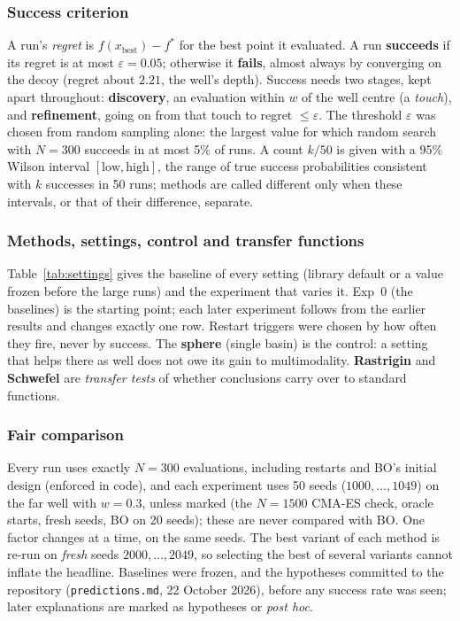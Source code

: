 \documentclass[10pt,a4paper]{article}
\begin{document}
\subsubsection{Success criterion}
A run's \emph{regret} is $f(x_{\text{best}})-f^\ast$ for the best point it evaluated. A run \textbf{succeeds} if its regret is at most $\varepsilon=0.05$; otherwise it \textbf{fails}, almost always by converging on the decoy (regret about $2.21$, the well's depth). Success needs two stages, kept apart throughout: \textbf{discovery}, an evaluation within $w$ of the well centre (a \emph{touch}), and \textbf{refinement}, going on from that touch to regret $\le\varepsilon$. The threshold $\varepsilon$ was chosen from random sampling alone: the largest value for which random search with $N=300$ succeeds in at most 5\% of runs. A count $k/50$ is given with a 95\% Wilson interval $[\text{low},\text{high}]$, the range of true success probabilities consistent with $k$ successes in 50 runs; methods are called different only when these intervals, or that of their difference, separate.

\subsubsection{Methods, settings, control and transfer functions}
Table~\ref{tab:settings} gives the baseline of every setting (library default or a value frozen before the large runs) and the experiment that varies it. Exp~0 (the baselines) is the starting point; each later experiment follows from the earlier results and changes exactly one row. Restart triggers were chosen by how often they fire, never by success. The \textbf{sphere} (single basin) is the control: a setting that helps there as well does not owe its gain to multimodality. \textbf{Rastrigin} and \textbf{Schwefel} are \emph{transfer tests} of whether conclusions carry over to standard functions.

\subsubsection{Fair comparison}
Every run uses exactly $N=300$ evaluations, including restarts and BO's initial design (enforced in code), and each experiment uses 50 seeds ($1000,\dots,1049$) on the far well with $w=0.3$, unless marked (the $N=1500$ CMA-ES check, oracle starts, fresh seeds, BO on 20 seeds); these are never compared with BO. One factor changes at a time, on the same seeds. The best variant of each method is re-run on \emph{fresh} seeds $2000,\dots,2049$, so selecting the best of several variants cannot inflate the headline. Baselines were frozen, and the hypotheses committed to the repository (\texttt{predictions.md}, 22 October 2026), before any success rate was seen; later explanations are marked as hypotheses or \emph{post hoc}.
\end{document}
